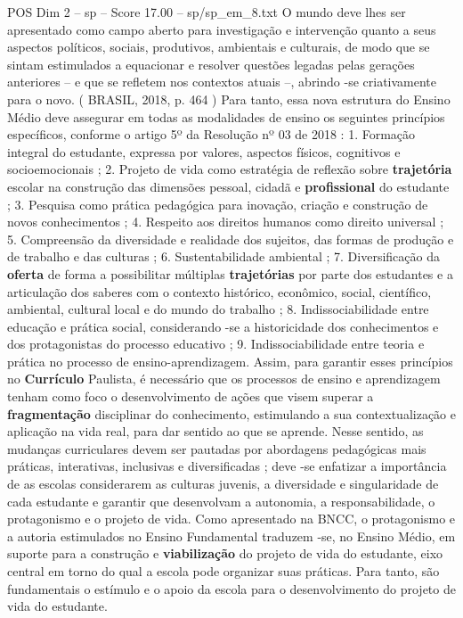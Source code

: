 \begin{textsample}{POS Dim 2 – sp – Score 17.00 – sp/sp\_em\_8.txt}
O mundo deve lhes ser apresentado como campo aberto para investigação e intervenção quanto a seus aspectos políticos, sociais, produtivos, ambientais e culturais, de modo que se sintam estimulados a equacionar e resolver questões legadas pelas gerações anteriores – e que se refletem nos contextos atuais –, abrindo -se criativamente para o novo. ( BRASIL, 2018, p. 464 ) Para tanto, essa nova estrutura do Ensino Médio deve assegurar em todas as modalidades de ensino os seguintes princípios específicos, conforme o artigo 5º da Resolução nº 03 de 2018 : 1.
Formação integral do estudante, expressa por valores, aspectos físicos, cognitivos e socioemocionais ; 2.
Projeto de vida como estratégia de reflexão sobre \textbf{trajetória} escolar na construção das dimensões pessoal, cidadã e \textbf{profissional} do estudante ; 3.
Pesquisa como prática pedagógica para inovação, criação e construção de novos conhecimentos ; 4.
Respeito aos direitos humanos como direito universal ; 5.
Compreensão da diversidade e realidade dos sujeitos, das formas de produção e de trabalho e das culturas ; 6.
Sustentabilidade ambiental ; 7.
Diversificação da \textbf{oferta} de forma a possibilitar múltiplas \textbf{trajetórias} por parte dos estudantes e a articulação dos saberes com o contexto histórico, econômico, social, científico, ambiental, cultural local e do mundo do trabalho ; 8.
Indissociabilidade entre educação e prática social, considerando -se a historicidade dos conhecimentos e dos protagonistas do processo educativo ; 9.
Indissociabilidade entre teoria e prática no processo de ensino-aprendizagem.
Assim, para garantir esses princípios no \textbf{Currículo} Paulista, é necessário que os processos de ensino e aprendizagem tenham como foco o desenvolvimento de ações que visem superar a \textbf{fragmentação} disciplinar do conhecimento, estimulando a sua contextualização e aplicação na vida real, para dar sentido ao que se aprende.
Nesse sentido, as mudanças curriculares devem ser pautadas por abordagens pedagógicas mais práticas, interativas, inclusivas e diversificadas ; deve -se enfatizar a importância de as escolas considerarem as culturas juvenis, a diversidade e singularidade de cada estudante e garantir que desenvolvam a autonomia, a responsabilidade, o protagonismo e o projeto de vida.
Como apresentado na BNCC, o protagonismo e a autoria estimulados no Ensino Fundamental traduzem -se, no Ensino Médio, em suporte para a construção e \textbf{viabilização} do projeto de vida do estudante, eixo central em torno do qual a escola pode organizar suas práticas.
Para tanto, são fundamentais o estímulo e o apoio da escola para o desenvolvimento do projeto de vida do estudante.

\end{textsample}
